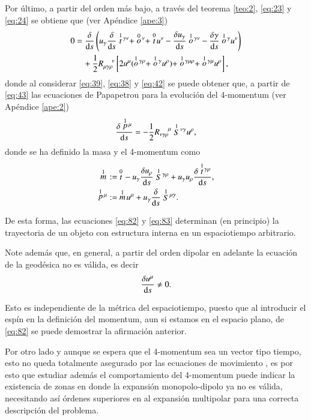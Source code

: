 Por último, a partir del orden más bajo, a través del teorema \ref{teo:2}, \eqref{eq:23} y \eqref{eq:24} se obtiene que (ver Apéndice \ref{ape:3})
\begin{align}
\label{eq:43}
0 &= \cd{} \left( u_{\gamma} \cd{} \des{1}{t}^{\gamma \nu} + \des{0}{o}^{\nu} + \des{0}{t} u^{\nu} - \cd{u_{\gamma}} \des{1}{o}^{\gamma \nu} - \cd{\gamma} \des{1}{o}^{\gamma}u^{\nu} \right) \nonumber \\
& \quad + \frac{1}{2} R^{\ \ \ \ \nu}_{\mu \gamma \rho} \left[ 2u^{\mu}(\des{1}{o}^{\gamma \rho} + \des{1}{o}^{\gamma} u^{\rho}) + \des{1}{o}^{\gamma \mu \rho} + \des{1}{o}^{\gamma \mu}  u^{\rho}  \right],
\end{align}
donde al considerar \eqref{eq:39}, \eqref{eq:38} y \eqref{eq:42} se puede obtener que, a partir de \eqref{eq:43} las ecuaciones de Papapetrou para la evolución del 4-momentum (ver Apéndice \ref{ape:2})
\begin{equation}
\label{eq:82}
\frac{\delta \stackrel{1}{p}{\!}^{\mu}}{\mathrm{d}s} = -\frac{1}{2} R^{\ \ \ \ \mu}_{\nu \gamma \rho} \stackrel{1}{S}{\!}^{\nu \gamma} u^{\rho},
\end{equation}
donde se ha definido la masa y el 4-momentum como
\begin{align}
\stackrel{1}{m}{\!} &:=\ \stackrel{0}{t}{\!} - u_{\gamma} \frac{\delta u_{\rho}}{\mathrm{d}s} \stackrel{1}{S}{\!}^{\gamma \rho} + u_{\gamma} u_{\rho} \frac{\delta \stackrel{1}{t}{\!}^{\gamma \rho}}{\mathrm{d}s},\\
\label{eq:44}
\stackrel{1}{p}{\!}^{\mu} &:=\ \stackrel{1}{m}{\!} u^{\mu} + u_{\gamma} \frac{\delta }{\mathrm{d}s} \stackrel{1}{S}{\!}^{\mu \gamma}.
\end{align}

De esta forma, las ecuaciones \eqref{eq:82} y \eqref{eq:83} determinan (en principio) la trayectoria de un objeto con estructura interna en un espaciotiempo arbitrario.

Note además que, en general, a partir del orden dipolar en adelante la ecuación de la geodésica no es válida, es decir
\begin{equation}
\frac{\delta u^{\mu}}{\mathrm{d}s} \neq 0.
\end{equation}

Esto es independiente de la métrica del espaciotiempo, puesto que al introducir el espín en la definición del momentum, aun si estamos en el espacio plano, de \eqref{eq:82} se puede demostrar la afirmación anterior.

Por otro lado y aunque se espera que el 4-momentum sea un vector tipo tiempo, esto no queda totalmente asegurado por las ecuaciones de movimiento \cite{Costa-Semerak}, es por esto que estudiar además el comportamiento del 4-momentum puede indicar la existencia de zonas en donde la expansión monopolo-dipolo ya no es válida, necesitando así órdenes superiores en al expansión multipolar para una correcta descripción del problema.

